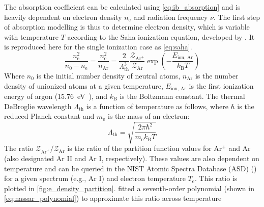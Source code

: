         The absorption coefficient can be calculated using \autoref{eq:ib_absorption} and is heavily dependent on electron density $n_\mathrm{e}$ and radiation frequency $\nu$. The first step of absorption modelling is thus to determine electron density, which is variable with temperature $T$ according to the Saha ionization equation, developed by \textcite{sahaPhysicalTheoryStellar1997}. It is reproduced here for the single ionization case as \autoref{eq:saha}.
        \begin{equation}
            \frac{n_\mathrm{e}^2}{n_0-n_\mathrm{e}} = \frac{n_\mathrm{e}^2}{n_\mathrm{Ar}} = \frac{2}{\Lambda_\mathrm{th}^3}\frac{\mathcal{Z}_{\mathrm{Ar}^+}}{\mathcal{Z}_\mathrm{Ar}}\exp{\left(-\frac{E_\text{ion, Ar}}{k_\mathrm{B}T}\right)}
            \label{eq:saha}
        \end{equation}
        Where $n_0$ is the initial number density of neutral atoms, $n_\mathrm{Ar}$ is the number density of unionized atoms at a given temperature, $E_\text{ion, Ar}$ is the first ionization energy of argon (\qty{15.76}{eV}~\cite{liasIonizationEnergyEvaluation2023}), and $k_\mathrm{B}$ is the Boltzmann constant. The thermal DeBroglie wavelength $\Lambda_\mathrm{th}$ is a function of temperature as follows, where $\hbar$ is the reduced Planck constant and $m_\mathrm{e}$ is the mass of an electron:
        \begin{equation*}
            \Lambda_\mathrm{th} = \sqrt{\frac{2\pi \hbar^2}{m_\mathrm{e}k_\mathrm{B}T}}
        \end{equation*}
        The ratio $\mathcal{Z}_{\mathrm{Ar}^+}/\mathcal{Z}_\mathrm{Ar}$ is the ratio of the partition function values for Ar$^+$ and Ar (also designated Ar II and Ar I, respectively). These values are also dependent on temperature and can be queried in the NIST Atomic Spectra Database (ASD) (\textcite{kramidaNISTAtomicSpectra2022}) for a given spectrum (e.g., Ar I) and electron temperature $T_\mathrm{e}$. This ratio is plotted in \autoref{fig:e_density_partition}. \citeauthor{nassarInvestigationLasersustainedPlasma2012} fitted a seventh-order polynomial (shown in \autoref{eq:nassar_polynomial}) to approximate this ratio across temperature

